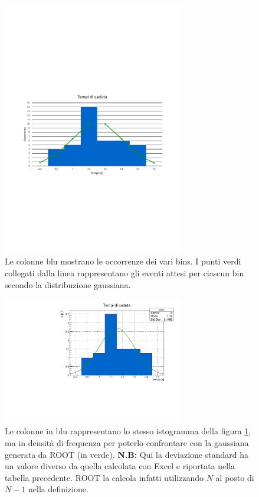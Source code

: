 \documentclass{article}
\begin{document}
\begin{figure}[h!]
\centering
\includegraphics[width=0.7\textwidth]{images/excel.pdf}
\caption{Le colonne blu mostrano le occorrenze dei vari bins. I punti verdi collegati dalla linea rappresentano gli eventi attesi per ciascun bin secondo la distribuzione gaussiana.}
\label{figure:tempi_excel}
\end{figure}

\begin{figure}[h!]
\centering
\includegraphics[width=0.7\textwidth]{images/root.pdf}
\caption{Le colonne in blu rappresentano lo stesso istogramma della figura \ref{figure:tempi_excel}, ma in densità di frequenza per poterlo confrontare con la gaussiana generata da ROOT (in verde). \textbf{N.B:} Qui la deviazione standard ha un valore diverso da quella calcolata con Excel e riportata nella tabella precedente. ROOT la calcola infatti utilizzando $N$ al posto di $N-1$ nella definizione.}
\label{figure:tempi_root}
\end{figure}
\end{document}
